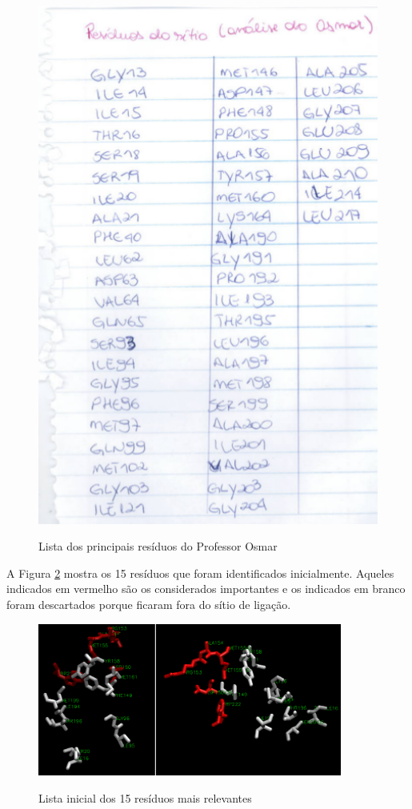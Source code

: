 \begin{figure}[h]
        \center
        \includegraphics[width=12cm]{images/ListaProfOsmar.png}
        \label{fig:ListaOsmar}
        \caption{Lista dos principais resíduos do Professor Osmar}
\end{figure}

A Figura \ref{fig:PlotResiduos} mostra os 15 resíduos que foram identificados inicialmente. Aqueles indicados em vermelho são os considerados importantes e os indicados em branco foram descartados porque ficaram fora do sítio de ligação.

\begin{figure}[h]
        \center
        \includegraphics[width=10cm]{images/avaliacao_Residuos_nomes.png}
        \label{fig:PlotResiduos}
        \caption{Lista inicial dos 15 resíduos mais relevantes}
\end{figure}

